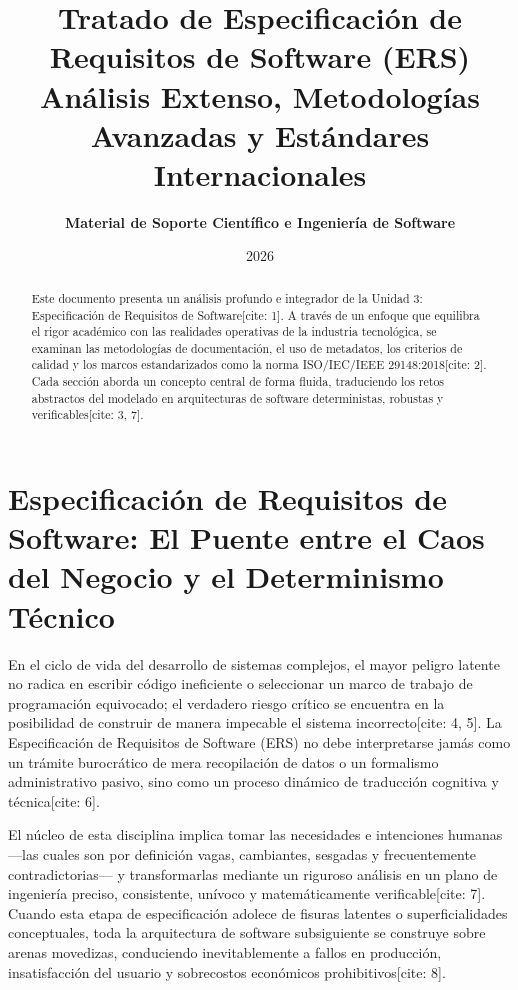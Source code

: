 \documentclass[11pt,a4paper]{article}
\title{\color{navyblue}\textbf{Tratado de Especificación de Requisitos de Software (ERS)}\\ \large Análisis Extenso, Metodologías Avanzadas y Estándares Internacionales}
\author{\textbf{Material de Soporte Científico e Ingeniería de Software}}
\date{2026}
\begin{document}
	
	\maketitle
	
	\begin{abstract}
		Este documento presenta un análisis profundo e integrador de la Unidad 3: Especificación de Requisitos de Software[cite: 1]. A través de un enfoque que equilibra el rigor académico con las realidades operativas de la industria tecnológica, se examinan las metodologías de documentación, el uso de metadatos, los criterios de calidad y los marcos estandarizados como la norma ISO/IEC/IEEE 29148:2018[cite: 2]. Cada sección aborda un concepto central de forma fluida, traduciendo los retos abstractos del modelado en arquitecturas de software deterministas, robustas y verificables[cite: 3, 7].
	\end{abstract}
	
	\vspace{1em}
	\tableofcontents
	\newpage
	
	\section{Especificación de Requisitos de Software: El Puente entre el Caos del Negocio y el Determinismo Técnico}
	En el ciclo de vida del desarrollo de sistemas complejos, el mayor peligro latente no radica en escribir código ineficiente o seleccionar un marco de trabajo de programación equivocado; el verdadero riesgo crítico se encuentra en la posibilidad de construir de manera impecable el sistema incorrecto[cite: 4, 5]. La Especificación de Requisitos de Software (ERS) no debe interpretarse jamás como un trámite burocrático de mera recopilación de datos o un formalismo administrativo pasivo, sino como un proceso dinámico de traducción cognitiva y técnica[cite: 6].
	
	El núcleo de esta disciplina implica tomar las necesidades e intenciones humanas —las cuales son por definición vagas, cambiantes, sesgadas y frecuentemente contradictorias— y transformarlas mediante un riguroso análisis en un plano de ingeniería preciso, consistente, unívoco y matemáticamente verificable[cite: 7]. Cuando esta etapa de especificación adolece de fisuras latentes o superficialidades conceptuales, toda la arquitectura de software subsiguiente se construye sobre arenas movedizas, conduciendo inevitablemente a fallos en producción, insatisfacción del usuario y sobrecostos económicos prohibitivos[cite: 8].
	
\end{document}
